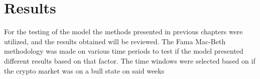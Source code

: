 \chapter{Results}
\label{c5}
For the testing of the model the methods presented in previous chapters were utilized, and the results obtained will be reviewed. The Fama Mac-Beth methodology was made on various time periods to test if the model presented different results based on that factor. The time windows were selected based on if the crypto market was on a bull state on said weeks